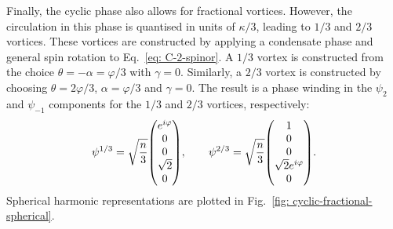 Finally, the cyclic phase also allows for fractional vortices.
However, the circulation in this phase is quantised in units of \(\kappa / 3\),
leading to \(1/3\) and \(2/3\) vortices.
These vortices are constructed by applying a condensate phase and general spin
rotation to Eq.~\eqref{eq: C-2-spinor}.
A \(1/3\) vortex is constructed from the choice
\(\theta = -\alpha = \varphi/3 \) with \(\gamma = 0\).
Similarly, a \(2/3\) vortex is constructed by choosing \(\theta = 2\varphi/3\),
\(\alpha = \varphi/3\) and \(\gamma=0\).
The result is a phase winding in the \(\psi_2\) and \(\psi_{-1}\) components
for the \(1/3\) and \(2/3\) vortices, respectively:
\begin{equation}
    \psi^{1/3} = \sqrt{\frac{n}{3}}\mqty(e^{i\varphi} \\ 0 \\ 0 \\ \sqrt{2}\\0),
    \qquad
    \psi^{2/3} = \sqrt{\frac{n}{3}}\mqty(1 \\ 0 \\ 0 \\\sqrt{2}e^{i\varphi}\\0).
\end{equation}
Spherical harmonic representations are plotted in
Fig.~\ref{fig: cyclic-fractional-spherical}.
